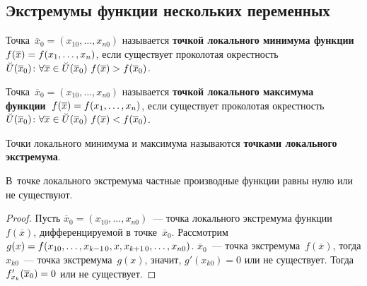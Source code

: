 \subsection{Экстремумы функции нескольких переменных}
 Точка~$\overline x_0 = (x_{10}, \ldots, x_{n0})$ называется \textbf{точкой локального минимума функции~$f(\overline x) \opbr= f(x_1, \ldots, \allowbreak x_n)$}, если существует проколотая окрестность
$\breve U(\overline x_0) \colon \forall \overline x \in \breve U(\overline x_0) \ \allowbreak
f(\overline x) \opbr> f(\overline x_0)$.
	
 Точка~$\overline x_0 = (x_{10}, \ldots, x_{n0})$ называется \textbf{точкой локального максимума функции~$f(\overline x) \opbr= f(x_1, \ldots, \allowbreak x_n)$}, если существует проколотая окрестность
$\breve U(\overline x_0) \colon \forall \overline x \in \breve U(\overline x_0) \ \allowbreak
f(\overline x) \opbr< f(\overline x_0)$.

 Точки локального минимума и максимума называются \textbf{точками локального экстремума}.
	
\begin{theorem}
В~точке локального экстремума частные производные функции равны нулю или не существуют.
\end{theorem}
\begin{proof}
Пусть $\overline x_0 = (x_{10}, \ldots, x_{n0})$~--- точка локального экстремума функции~$f(\overline x)$, дифференцируемой в точке~$\overline x_0$.
Рассмотрим
$g(x) \opbr= f(x_{10}, \ldots, \allowbreak x_{k-1\,0}, x, x_{k+1\,0}, \ldots, \allowbreak x_{n0})$.
$\overline x_0$~--- точка экстремума~$f(\overline x)$, тогда $x_{k0}$~--- точка экстремума~$g(x)$, значит, $g'(x_{k0}) = 0$ или не существует.
Тогда $f_{x_k}'(\overline x_0) \opbr= 0$ или не существует.
\end{proof}

